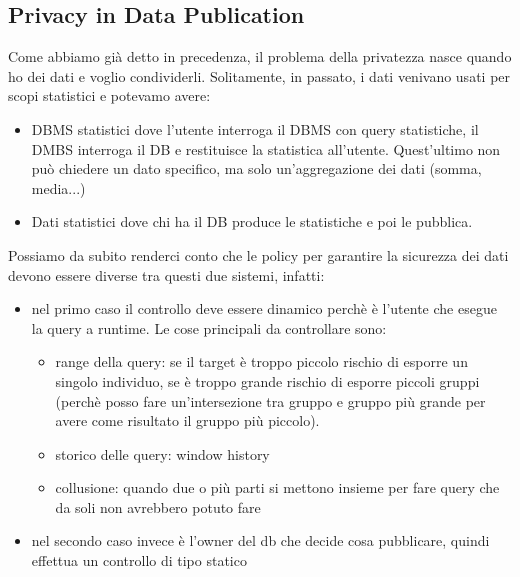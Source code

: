 \subsection{Privacy in Data Publication}
Come abbiamo già detto in precedenza, il problema della privatezza nasce quando ho dei dati e voglio condividerli. Solitamente, in passato, i dati venivano usati per scopi statistici e potevamo avere:
\begin{itemize}
    \item DBMS statistici dove l'utente interroga il DBMS con query statistiche, il DMBS interroga il DB e restituisce la statistica all'utente. Quest'ultimo non può chiedere un dato specifico, ma solo un'aggregazione dei dati (somma, media...)
    \item Dati statistici dove chi ha il DB produce le statistiche e poi le pubblica.
\end{itemize}
Possiamo da subito renderci conto che le policy per garantire la sicurezza dei dati devono essere diverse tra questi due sistemi, infatti:
\begin{itemize}
    \item nel primo caso il controllo deve essere dinamico perchè è l'utente che esegue la query a runtime. Le cose principali da controllare sono:
    \begin{itemize}
        \item range della query: se il target è troppo piccolo rischio di esporre un singolo individuo, se è troppo grande rischio di esporre piccoli gruppi (perchè posso fare un'intersezione tra gruppo e gruppo più grande per avere come risultato il gruppo più piccolo).
        \item storico delle query: window history
        \item collusione: quando due o più parti si mettono insieme per fare query che da soli non avrebbero potuto fare
    \end{itemize}
    \item nel secondo caso invece è l'owner del db che decide cosa pubblicare, quindi effettua un controllo di tipo statico
\end{itemize}
